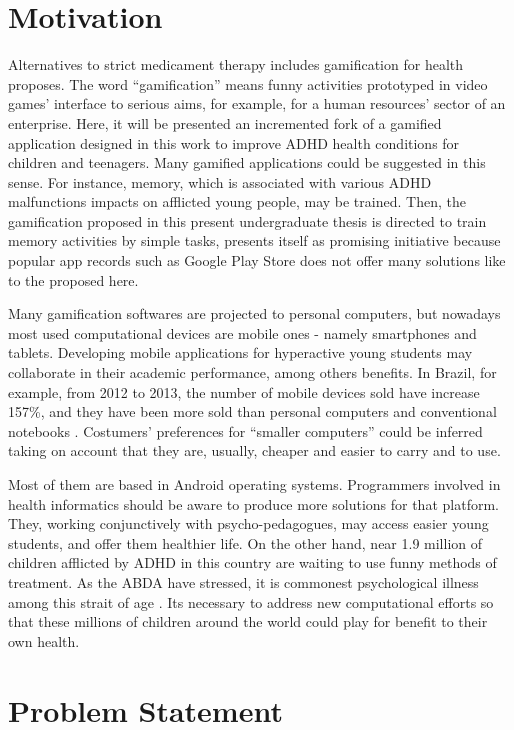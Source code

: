   
\section{Motivation}
\label{sc:motivation}

Alternatives to strict medicament therapy includes gamification for health proposes. The word ``gamification'' means funny activities prototyped in video games' interface to serious aims, for example, for a human resources' sector of an enterprise. Here, it will be presented an incremented fork of a gamified application designed in this work to improve ADHD health conditions for children and teenagers. Many gamified applications could be suggested in this sense. For instance, memory, which is associated with various ADHD malfunctions impacts on afflicted young people, may be trained. Then, the gamification proposed in this present undergraduate thesis is directed to train memory activities by simple tasks, presents itself as promising initiative because  popular app records such as Google Play Store does not offer many solutions like to the proposed here.

Many gamification softwares are projected to personal computers, but nowadays most used computational devices are mobile ones - namely smartphones and tablets. Developing mobile applications for hyperactive young students may collaborate in their academic performance, among others benefits. In Brazil, for example, from 2012 to 2013, the number of mobile devices sold have increase 157\%, and they have been more sold than personal computers and conventional notebooks \citep{Villa}. Costumers' preferences for ``smaller computers'' could be inferred taking on account that they are, usually, cheaper and easier to carry and to use.  

Most of them are based in Android operating systems. Programmers involved in health informatics should be aware to produce more solutions for that platform. They, working conjunctively with psycho-pedagogues, may access easier young students, and offer them healthier life. On the other hand, near 1.9 million of children afflicted by ADHD in this country are waiting to use funny methods of treatment. As the ABDA have stressed, it is commonest psychological illness among this strait of age  \citep{Villa}. Its necessary to address new computational efforts so that these millions of children around the world could play for benefit to their own health.


\section{Problem Statement}
\label{sc:problem} 

